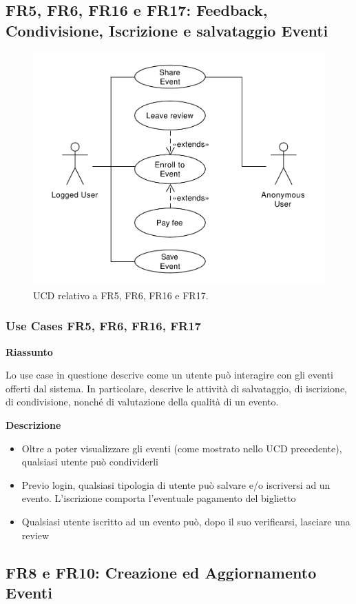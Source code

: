 \documentclass[9pt]{extarticle}
\begin{document}
\subsection{FR5, FR6, FR16 e FR17: Feedback, Condivisione, Iscrizione e salvataggio Eventi}


\begin{figure}[!htb]
	\centering
	\includegraphics[width=.6\linewidth]{./images/FR5-6-16-17.pdf}
	\caption{UCD relativo a FR5, FR6, FR16 e FR17.}
	\label{fig:UCD_FR5-6-16-17}
\end{figure}

\subsubsection*{Use Cases FR5, FR6, FR16, FR17}

\textbf{Riassunto}

Lo use case in questione descrive come un utente può interagire con gli eventi offerti dal sistema. In particolare, descrive le attività di salvataggio, di iscrizione, di condivisione, nonché di valutazione della qualità di un evento.

\textbf{Descrizione}

\begin{itemize}
	\item Oltre a poter visualizzare gli eventi (come mostrato nello UCD precedente), qualsiasi utente può condividerli
	\item Previo login, qualsiasi tipologia di utente può salvare e/o iscriversi ad un evento. L'iscrizione comporta l'eventuale pagamento del biglietto
	\item Qualsiasi utente iscritto ad un evento può, dopo il suo verificarsi, lasciare una review
\end{itemize}


\subsection{FR8 e FR10: Creazione ed Aggiornamento Eventi}
\end{document}
